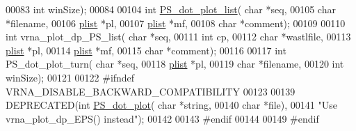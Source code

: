 \begin{DoxyCode}
00083                             \textcolor{keywordtype}{int} winSize);
00084 
00104 \textcolor{keywordtype}{int} \hyperlink{group__plotting__utils_ga00ea223b5cf02eb2faae5ff29f0d5e12}{PS\_dot\_plot\_list}( \textcolor{keywordtype}{char} *seq,
00105                       \textcolor{keywordtype}{char} *filename,
00106                       \hyperlink{group__struct__utils_structvrna__elem__prob__s}{plist} *pl,
00107                       \hyperlink{group__struct__utils_structvrna__elem__prob__s}{plist} *mf,
00108                       \textcolor{keywordtype}{char} *comment);
00109 
00110 \textcolor{keywordtype}{int} vrna\_plot\_dp\_PS\_list( \textcolor{keywordtype}{char} *seq,
00111                           \textcolor{keywordtype}{int} cp,
00112                           \textcolor{keywordtype}{char} *wastlfile,
00113                           \hyperlink{group__struct__utils_structvrna__elem__prob__s}{plist} *pl,
00114                           \hyperlink{group__struct__utils_structvrna__elem__prob__s}{plist} *mf,
00115                           \textcolor{keywordtype}{char} *comment);
00116 
00117 \textcolor{keywordtype}{int} PS\_dot\_plot\_turn( \textcolor{keywordtype}{char} *seq,
00118                       \hyperlink{group__struct__utils_structvrna__elem__prob__s}{plist} *pl,
00119                       \textcolor{keywordtype}{char} *filename,
00120                       \textcolor{keywordtype}{int} winSize);
00121 
00122 \textcolor{preprocessor}{#ifndef VRNA\_DISABLE\_BACKWARD\_COMPATIBILITY}
00123 
00139 DEPRECATED(\textcolor{keywordtype}{int} \hyperlink{group__plotting__utils_ga689a97a7e3b8a2df14728b8204d9d57b}{PS\_dot\_plot}( \textcolor{keywordtype}{char} *\textcolor{keywordtype}{string},
00140                             \textcolor{keywordtype}{char} *file),
00141 \textcolor{stringliteral}{"Use vrna\_plot\_dp\_EPS() instead"});
00142 
00143 \textcolor{preprocessor}{#endif}
00144 
00149 \textcolor{preprocessor}{#endif}
\end{DoxyCode}
